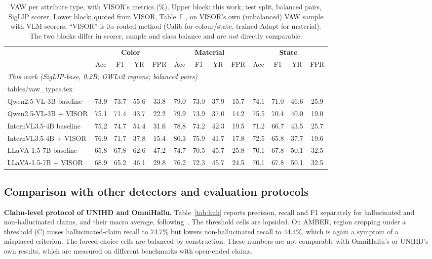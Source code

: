 \documentclass[11pt]{article}
\makeatletter
\newcommand{\tabinput}[1]{\@@input #1 }
\makeatother
\begin{document}
\begin{table}[!htbp]
\centering
\caption{VAW per attribute type, with VISOR's metrics (\%). Upper block: this work, test split, balanced pairs, SigLIP scorer. Lower block: quoted from VISOR, Table~I~\cite{zhang2026visor}, on VISOR's own (unbalanced) VAW sample with VLM scorers; ``VISOR'' is its routed method (Calib for colour/state, trained Adapt for material). The two blocks differ in scorer, sample and class balance and are \emph{not} directly comparable.}
\label{tab:visor}
\scriptsize
\setlength{\tabcolsep}{3pt}
\begin{tabular}{lcccccccccccc}
\toprule
 & \multicolumn{4}{c}{\textbf{Color}} & \multicolumn{4}{c}{\textbf{Material}} & \multicolumn{4}{c}{\textbf{State}} \\
\cmidrule(lr){2-5}\cmidrule(lr){6-9}\cmidrule(lr){10-13}
 & Acc & F1 & YR & FPR & Acc & F1 & YR & FPR & Acc & F1 & YR & FPR \\
\midrule
\multicolumn{13}{l}{\emph{This work (SigLIP-base, 0.2B; OWLv2 regions; balanced pairs)}} \\
\tabinput{tables/vaw_types.tex}
\midrule
\multicolumn{13}{l}{\emph{Quoted from VISOR~\cite{zhang2026visor} (VLM yes/no probing; VISOR's sample)}} \\
Qwen2.5-VL-3B baseline & 73.9 & 73.7 & 55.6 & 33.8 & 79.0 & 73.0 & 37.9 & 15.7 & 74.1 & 71.0 & 46.6 & 25.9 \\
Qwen2.5-VL-3B + VISOR & 75.1 & 71.4 & 43.7 & 22.2 & 79.9 & 73.9 & 37.0 & 14.2 & 75.5 & 70.4 & 40.0 & 19.0 \\
InternVL3.5-4B baseline & 75.2 & 74.7 & 54.4 & 31.6 & 78.8 & 74.2 & 42.3 & 19.5 & 71.2 & 66.7 & 43.5 & 25.7 \\
InternVL3.5-4B + VISOR & 76.9 & 71.7 & 37.8 & 15.4 & 80.3 & 75.9 & 41.7 & 17.8 & 72.5 & 65.8 & 37.7 & 19.6 \\
LLaVA-1.5-7B baseline & 65.8 & 67.8 & 62.6 & 47.2 & 74.7 & 70.5 & 45.7 & 25.8 & 70.1 & 67.8 & 50.1 & 32.5 \\
LLaVA-1.5-7B + VISOR & 68.9 & 65.2 & 46.1 & 29.8 & 76.2 & 72.3 & 45.7 & 24.5 & 70.1 & 67.8 & 50.1 & 32.5 \\
\bottomrule
\end{tabular}
\end{table}

\subsection{Comparison with other detectors and evaluation protocols}\label{sec:sota}
\textbf{Claim-level protocol of UNIHD and OmniHallu.} Table~\ref{tab:hnh} reports precision, recall and F1 separately for hallucinated and non-hallucinated claims, and their macro average, following~\cite{chen2024unihd,yang2026omnihallu}. The threshold cells are lopsided. On AMBER, region cropping under a threshold (C) raises hallucinated-claim recall to 74.7\% but lowers non-hallucinated recall to 44.4\%, which is again a symptom of a misplaced criterion. The forced-choice cells are balanced by construction. These numbers are not comparable with OmniHallu's or UNIHD's own results, which are measured on different benchmarks with open-ended claims.
\end{document}
